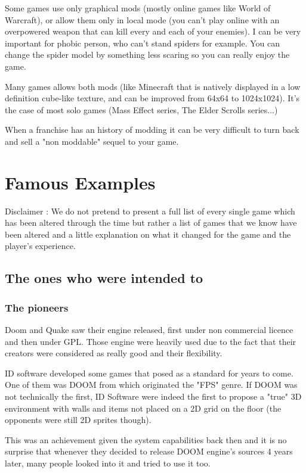 \documentclass[a4paper,12pt]{article}
\begin{document}
Some games use only graphical mods (mostly online games like World of Warcraft), or allow them only in local mode (you can't play online with an overpowered weapon that can kill every and each of your enemies). I can be very important for phobic person, who can't stand spiders for example. You can change the spider model by something less scaring so you can really enjoy the game.

Many games allows both mods (like Minecraft that is natively displayed in a low definition cube-like texture, and can be improved from 64x64 to 1024x1024). It's the case of most solo games (Mass Effect series, The Elder Scrolls series...)

When a franchise has an history of modding it can be very difficult to turn back and sell a "non moddable" sequel to your game.

\newpage
\section{Famous Examples}

Disclaimer : We do not pretend to present a full list of every single game which has been altered through the time but rather a list of games that we know have been altered and a little explanation on what it changed for the game and the player's experience.

\subsection{The ones who were intended to}

\subsubsection{The pioneers}

Doom and Quake saw their engine released, first under non commercial licence and then under GPL. Those engine were heavily used due to the fact that their creators were considered as really good and their flexibility.

ID software developed some games that posed as a standard for years to come. One of them was DOOM from which originated the "FPS" genre. If DOOM was not technically the first, ID Software were indeed the first to propose a "true" 3D environment with walls and items not placed on a 2D grid on the floor (the opponents were still 2D sprites though).

This was an achievement given the system capabilities back then and it is no surprise that whenever they decided to release DOOM engine's sources 4 years later, many people looked into it and tried to use it too.
\end{document}
